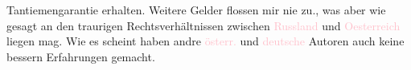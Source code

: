                Tantiemengarantie erhalten. Weitere Gelder flossen mir nie zu., was aber wie gesagt
               an den traurigen Rechtsverhältnissen zwischen \textcolor{pink}{Russland}{}\ledrightnote{\textcolor{pink}{Russland}} und \textcolor{pink}{Oesterreich}{}\ledrightnote{\textcolor{pink}{Österreich}} liegen mag. Wie
               es scheint haben andre \textcolor{pink}{österr.}{}\ledrightnote{\textcolor{pink}{Österreich}} und \textcolor{pink}{deutsche}{}\ledrightnote{\textcolor{pink}{Deutschland}} Autoren auch keine bessern Erfahrungen
               gemacht.\pend
           \endnumbering{}  
      